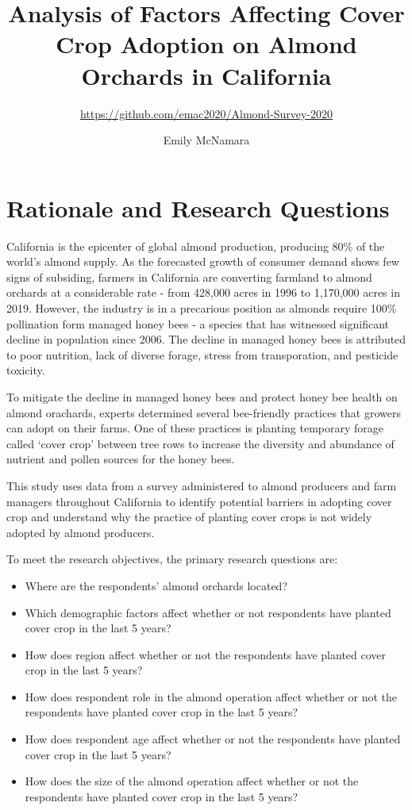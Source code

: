 \documentclass[12pt,]{article}
\title{Analysis of Factors Affecting Cover Crop Adoption on Almond Orchards in
California}
\subtitle{\url{https://github.com/emac2020/Almond-Survey-2020}}
\author{Emily McNamara}
\date{}
\providecommand{\tightlist}{%
  \setlength{\itemsep}{0pt}\setlength{\parskip}{0pt}}
\begin{document}
\maketitle

\newpage

\tableofcontents  \newpage
\listoftables  \newpage
\listoffigures  \newpage

\section{Rationale and Research
Questions}\label{rationale-and-research-questions}

California is the epicenter of global almond production, producing 80\%
of the world's almond supply. As the forecasted growth of consumer
demand shows few signs of subsiding, farmers in California are
converting farmland to almond orchards at a considerable rate - from
428,000 acres in 1996 to 1,170,000 acres in 2019. However, the industry
is in a precarious position as almonds require 100\% pollination form
managed honey bees - a species that has witnessed significant decline in
population since 2006. The decline in managed honey bees is attributed
to poor nutrition, lack of diverse forage, stress from transporation,
and pesticide toxicity.

To mitigate the decline in managed honey bees and protect honey bee
health on almond orachards, experts determined several bee-friendly
practices that growers can adopt on their farms. One of these practices
is planting temporary forage called `cover crop' between tree rows to
increase the diversity and abundance of nutrient and pollen sources for
the honey bees.

This study uses data from a survey administered to almond producers and
farm managers throughout California to identify potential barriers in
adopting cover crop and understand why the practice of planting cover
crops is not widely adopted by almond producers.

To meet the research objectives, the primary research questions are:

\begin{itemize}
\tightlist
\item
  Where are the respondents' almond orchards located?
\item
  Which demographic factors affect whether or not respondents have
  planted cover crop in the last 5 years?
\item
  How does region affect whether or not the respondents have planted
  cover crop in the last 5 years?
\item
  How does respondent role in the almond operation affect whether or not
  the respondents have planted cover crop in the last 5 years?
\item
  How does respondent age affect whether or not the respondents have
  planted cover crop in the last 5 years?
\item
  How does the size of the almond operation affect whether or not the
  respondents have planted cover crop in the last 5 years?
\end{itemize}
\end{document}
